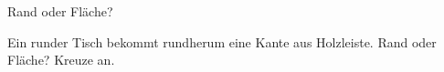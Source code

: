 \setcounter{aufgabe}{8}

\begin{aufgabe}{Rand oder Fläche?}
\begin{teile}
\teil Ein runder Tisch bekommt rundherum eine Kante aus Holzleiste. Rand oder Fläche? Kreuze an.\\ \\ 
\end{teile}
\end{aufgabe}

